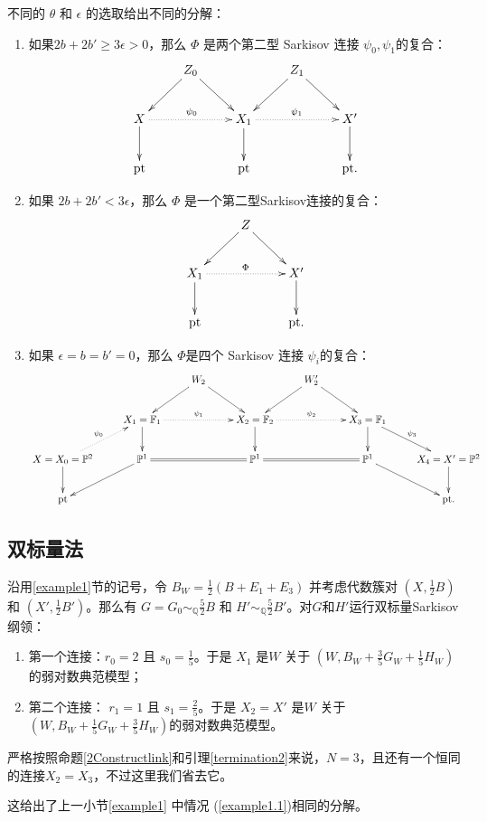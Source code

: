 不同的 $\theta$ 和  $\epsilon$ 的选取给出不同的分解：
\begin{enumerate}
  \item\label{example1.1} 如果$ 2b+2b'\geqslant 3\epsilon>0 $，那么  $\Phi$ 是两个第二型 Sarkisov 连接 $\psi_{0},\psi_{1}$的复合： 
    \[ \xymatrix{
        &Z_{0}\ar[rd]\ar[ld] & &Z_{1}\ar[rd]\ar[ld]\\
        X\ar[d]\ar@{.>}[rr]^{\psi_{0}}& &X_{1}\ar@{.>}[rr]^{\psi_{1}}\ar[d]&&X'\ar[d]\\
        \text{pt}&&\text{pt}&&\text{pt} .} \]
  \item 如果 $ 2b+2b'< 3\epsilon $，那么 $\Phi$ 是一个第二型Sarkisov连接的复合：
        \[ \xymatrix{
            &Z\ar[rd]\ar[ld] & \\
            X_{1}\ar@{.>}[rr]^{\Phi}\ar[d]& &X'\ar[d]\\
            \text{pt}&&\text{pt} .} \]
  \item 如果 $ \epsilon=b=b'=0 $，那么 $\Phi$是四个 Sarkisov 连接 $\psi_{i}$的复合：
        \[ \xymatrix{
          &&W_2\ar[ld]\ar[rd]&&W_2'\ar[ld]\ar[rd]\\
          &X_1=\mathbb{F}_1\ar@{.>}[rr]^{\psi_{1}}\ar[d]&&X_2=\mathbb{F}_2\ar@{.>}[rr]^{\psi_{2}}\ar[d]&&X_3=\mathbb{F}_1\ar[d]\ar[rd]^{\psi_{3}}\\
          X=X_0=\mathbb{P}^2\ar[d]\ar@{.>}[ru]^{\psi_{0}}&\mathbb{P}^1\ar[ld]\ar@{=}[rr]&&\mathbb{P}^1\ar@{=}[rr]&&\mathbb{P}^1\ar[rd]&X_4=X'=\mathbb{P}^2\ar[d]\\
          \text{pt}&&&&&&\text{pt} .} \]
\end{enumerate}

\subsection{双标量法}
沿用\ref{example1}节的记号，令 $B_{W}=\frac{1}{2}(B+E_{1}+E_{3})$ 并考虑代数簇对 $(X,\frac{1}{2}B)$ 和 $(X',\frac{1}{2}B')$。那么有 $G=G_{0}\sim_{\mathbb{Q}}\frac{5}{2}B$ 和 $H'\sim_{\mathbb{Q}}\frac{5}{2}B'$。对$G$和$H'$运行双标量Sarkisov纲领：
\begin{enumerate}
  \item 第一个连接：$r_{0}=2$ 且 $s_{0}=\frac{1}{5}$。于是 $X_{1}$ 是$W$  关于 $(W,B_{W}+\frac{3}{5}G_{W}+\frac{1}{5}H_{W})$的弱对数典范模型；
  \item 第二个连接： $r_{1}=1$ 且 $s_{1}=\frac{2}{5}$。于是 $X_{2}= X'$ 是$W$ 关于  $(W,B_{W}+\frac{1}{5}G_{W}+\frac{3}{5}H_{W})$的弱对数典范模型。
\end{enumerate}
\begin{remark}
严格按照命题\ref{2Constructlink}和引理\ref{termination2}来说，$N=3 $，且还有一个恒同的连接$X_{2}=X_{3}$，不过这里我们省去它。
\end{remark}
\begin{remark}
  这给出了上一小节\ref{example1} 中情况 (\ref{example1.1})相同的分解。
\end{remark}

